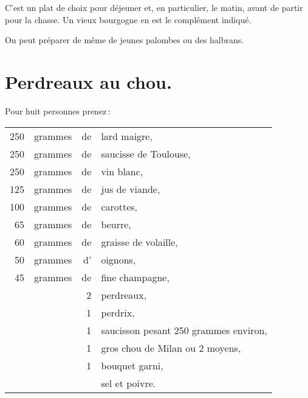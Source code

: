 C'est un plat de choix pour déjeuner et, en particulier, le matin, avant de
partir pour la chasse. Un vieux bourgogne en est le complément indiqué.

\sk

On peut préparer de même de jeunes palombes ou des halbrans.

\section*{\centering Perdreaux au chou.}
{}

Pour huit personnes prenez :

\smallskip

\footnotesize
\begin{longtable}{rrrp{16em}}
    250 & grammes & de & lard maigre,                                                                     \\
    250 & grammes & de & saucisse de Toulouse,                                                            \\
    250 & grammes & de & vin blanc,                                                                       \\
    125 & grammes & de & jus de viande,                                                                   \\
    100 & grammes & de & carottes,                                                                        \\
     65 & grammes & de & beurre,                                                                          \\
     60 & grammes & de & graisse de volaille,                                                             \\
     50 & grammes & d' & oignons,                                                                         \\
     45 & grammes & de & fine champagne,                                                                  \\
        &         &  2 & perdreaux,                                                                       \\
        &         &  1 & perdrix,                                                                         \\
        &         &  1 & saucisson pesant 250 grammes environ,                                            \\
        &         &  1 & gros chou de Milan ou 2 moyens,                                                  \\
        &         &  1 & bouquet garni,                                                                   \\
        &         &    & sel et poivre.                                                                   \\
\end{longtable}
\normalsize

